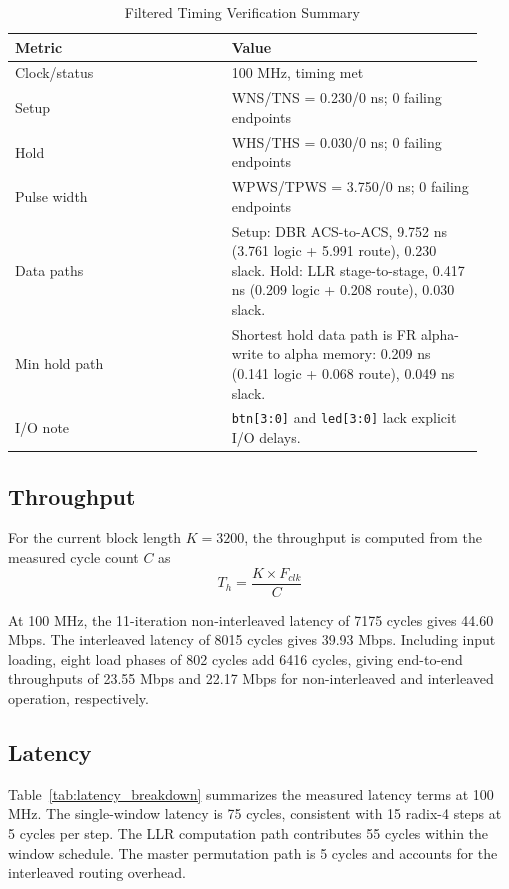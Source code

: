 \documentclass[conference]{IEEEtran}
\begin{document}
\begin{table}[htbp]
\caption{Filtered Timing Verification Summary}
\begin{center}
\scriptsize
\begin{tabular}{@{}p{0.43\linewidth}p{0.50\linewidth}@{}}
\toprule
\textbf{Metric} & \textbf{Value} \\
\midrule
Clock/status & 100 MHz, timing met \\
Setup & WNS/TNS = 0.230/0 ns; 0 failing endpoints \\
Hold & WHS/THS = 0.030/0 ns; 0 failing endpoints \\
Pulse width & WPWS/TPWS = 3.750/0 ns; 0 failing endpoints \\
Data paths & Setup: DBR ACS-to-ACS, 9.752 ns (3.761 logic + 5.991 route), 0.230 slack. Hold: LLR stage-to-stage, 0.417 ns (0.209 logic + 0.208 route), 0.030 slack. \\
Min hold path & Shortest hold data path is FR alpha-write to alpha memory: 0.209 ns (0.141 logic + 0.068 route), 0.049 ns slack. \\
I/O note & \texttt{btn[3:0]} and \texttt{led[3:0]} lack explicit I/O delays. \\
\bottomrule
\end{tabular}
\label{tab:timing_summary}
\end{center}
\end{table}

\subsection{Throughput}
For the current block length $K=3200$, the throughput is computed from the measured cycle count $C$ as
\begin{equation}
T_h = \frac{K \times F_{clk}}{C}
\end{equation}

At 100 MHz, the 11-iteration non-interleaved latency of 7175 cycles gives 44.60 Mbps. The interleaved latency of 8015 cycles gives 39.93 Mbps. Including input loading, eight load phases of 802 cycles add 6416 cycles, giving end-to-end throughputs of 23.55 Mbps and 22.17 Mbps for non-interleaved and interleaved operation, respectively.

\subsection{Latency}
Table~\ref{tab:latency_breakdown} summarizes the measured latency terms at 100 MHz. The single-window latency is 75 cycles, consistent with 15 radix-4 steps at 5 cycles per step. The LLR computation path contributes 55 cycles within the window schedule. The master permutation path is 5 cycles and accounts for the interleaved routing overhead.
\end{document}
